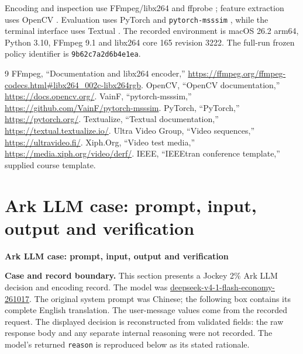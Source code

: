 \documentclass[conference]{IEEEtran}
\begin{document}
Encoding and inspection use FFmpeg/libx264 and ffprobe \cite{ffmpeg}; feature extraction uses OpenCV \cite{opencv}. Evaluation uses PyTorch and \texttt{pytorch-msssim} \cite{pytorch,msssim}, while the terminal interface uses Textual \cite{textual}. The recorded environment is macOS 26.2 arm64, Python 3.10, FFmpeg 9.1 and libx264 core 165 revision 3222. The full-run frozen policy identifier is \texttt{9b62c7a2d6b4e1ea}.

\begin{thebibliography}{9}\footnotesize
{} FFmpeg, ``Documentation and libx264 encoder,'' \url{https://ffmpeg.org/ffmpeg-codecs.html#libx264_002c-libx264rgb}.
 OpenCV, ``OpenCV documentation,'' \url{https://docs.opencv.org/}.
 VainF, ``pytorch-msssim,'' \url{https://github.com/VainF/pytorch-msssim}.
 PyTorch, ``PyTorch,'' \url{https://pytorch.org/}.
 Textualize, ``Textual documentation,'' \url{https://textual.textualize.io/}.
 Ultra Video Group, ``Video sequences,'' \url{https://ultravideo.fi/}.
 Xiph.Org, ``Video test media,'' \url{https://media.xiph.org/video/derf/}.
 IEEE, ``IEEEtran conference template,'' supplied course template.
\end{thebibliography}
\clearpage\onecolumn
\appendix
\section{Ark LLM case: prompt, input, output and verification}\label{app:llmcase}
\noindent\textbf{Ark LLM case: prompt, input, output and verification}\par\smallskip
\textbf{Case and record boundary.} This section presents a Jockey 2\% Ark LLM decision and encoding record. The model was \url{deepseek-v4-1-flash-economy-261017}. The original system prompt was Chinese; the following box contains its complete English translation. The user-message values come from the recorded request. The displayed decision is reconstructed from validated fields: the raw response body and any separate internal reasoning were not recorded. The model's returned \texttt{reason} is reproduced below as its stated rationale.
\end{document}
